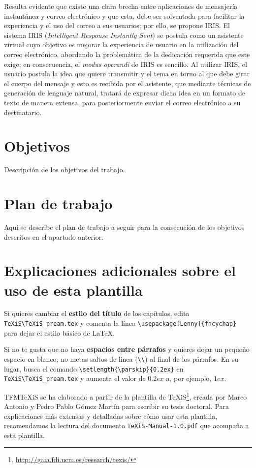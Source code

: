Resulta evidente que existe una clara brecha entre aplicaciones de mensajería instantánea y correo electrónico y que esta, debe ser solventada para facilitar la experiencia y el uso del correo a sus usuarios; por ello, se propone IRIS. El sistema IRIS (\textit{Intelligent Response Instantly Sent}) se postula como un asistente virtual cuyo objetivo es mejorar la experiencia de usuario en la utilización del correo electrónico, abordando la problemática de la dedicación requerida que este exige; en consecuencia, el \textit{modus operandi} de IRIS es sencillo. Al utilizar IRIS, el usuario postula la idea que quiere transmitir y el tema en torno al que debe girar el cuerpo del mensaje y esto es recibida por el asistente, que mediante técnicas de generación de lenguaje natural, tratará de expresar dicha idea en un formato de texto de manera extensa, para posteriormente enviar el correo electrónico a su destinatario.


\section{Objetivos}
Descripción de los objetivos del trabajo.


\section{Plan de trabajo}
Aquí se describe el plan de trabajo a seguir para la consecución de los objetivos descritos en el apartado anterior.



\section{Explicaciones adicionales sobre el uso de esta plantilla}
Si quieres cambiar el \textbf{estilo del título} de los capítulos, edita \verb|TeXiS\TeXiS_pream.tex| y comenta la línea \verb|\usepackage[Lenny]{fncychap}| para dejar el estilo básico de \LaTeX.

Si no te gusta que no haya \textbf{espacios entre párrafos} y quieres dejar un pequeño espacio en blanco, no metas saltos de línea (\verb|\\|) al final de los párrafos. En su lugar, busca el comando  \verb|\setlength{\parskip}{0.2ex}| en \verb|TeXiS\TeXiS_pream.tex| y aumenta el valor de $0.2ex$ a, por ejemplo, $1ex$.

TFMTeXiS se ha elaborado a partir de la plantilla de TeXiS\footnote{\url{http://gaia.fdi.ucm.es/research/texis/}}, creada por Marco Antonio y Pedro Pablo Gómez Martín para escribir su tesis doctoral. Para explicaciones más extensas y detalladas sobre cómo usar esta plantilla, recomendamos la lectura del documento \texttt{TeXiS-Manual-1.0.pdf} que acompaña a esta plantilla.

